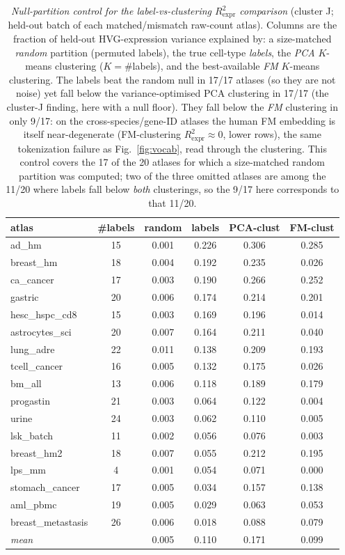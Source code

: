 \documentclass[fleqn,10pt,lineno]{wlpeerj}  %
\begin{document}
\begin{table}[htbp]\centering\footnotesize
\caption{\emph{Null-partition control for the label-vs-clustering $R^2_{\mathrm{expr}}$ comparison} (cluster J; held-out batch of each matched/mismatch raw-count atlas). Columns are the fraction of held-out HVG-expression variance explained by: a size-matched \emph{random} partition (permuted labels), the true cell-type \emph{labels}, the \emph{PCA} $K$-means clustering ($K{=}$\#labels), and the best-available \emph{FM} $K$-means clustering. The labels beat the random null in 17/17 atlases (so they are not noise) yet fall below the variance-optimised PCA clustering in 17/17 (the cluster-J finding, here with a null floor). They fall below the \emph{FM} clustering in only 9/17: on the cross-species/gene-ID atlases the human FM embedding is itself near-degenerate (FM-clustering $R^2_{\mathrm{expr}}\!\approx\!0$, lower rows), the same tokenization failure as Fig.~\ref{fig:vocab}, read through the clustering. This control covers the 17 of the 20 atlases for which a size-matched random partition was computed; two of the three omitted atlases are among the 11/20 where labels fall below \emph{both} clusterings, so the 9/17 here corresponds to that 11/20.}
\label{tab:nullctrl}
\begin{tabular}{@{}lccccc@{}}
\toprule
atlas & \#labels & random & labels & PCA-clust & FM-clust \\
\midrule
ad\_hm & 15 & 0.001 & 0.226 & 0.306 & 0.285 \\
breast\_hm & 18 & 0.004 & 0.192 & 0.235 & 0.026 \\
ca\_cancer & 17 & 0.003 & 0.190 & 0.266 & 0.252 \\
gastric & 20 & 0.006 & 0.174 & 0.214 & 0.201 \\
hesc\_hspc\_cd8 & 15 & 0.003 & 0.169 & 0.196 & 0.014 \\
astrocytes\_sci & 20 & 0.007 & 0.164 & 0.211 & 0.040 \\
lung\_adre & 22 & 0.011 & 0.138 & 0.209 & 0.193 \\
tcell\_cancer & 16 & 0.005 & 0.132 & 0.175 & 0.026 \\
bm\_all & 13 & 0.006 & 0.118 & 0.189 & 0.179 \\
progastin & 21 & 0.003 & 0.064 & 0.122 & 0.004 \\
urine & 24 & 0.003 & 0.062 & 0.110 & 0.005 \\
lsk\_batch & 11 & 0.002 & 0.056 & 0.076 & 0.003 \\
breast\_hm2 & 18 & 0.007 & 0.055 & 0.212 & 0.195 \\
lps\_mm & 4 & 0.001 & 0.054 & 0.071 & 0.000 \\
stomach\_cancer & 17 & 0.005 & 0.034 & 0.157 & 0.138 \\
aml\_pbmc & 19 & 0.005 & 0.029 & 0.063 & 0.053 \\
breast\_metastasis & 26 & 0.006 & 0.018 & 0.088 & 0.079 \\
\midrule
\emph{mean} & & 0.005 & 0.110 & 0.171 & 0.099 \\
\bottomrule
\end{tabular}
\end{table}
\end{document}
